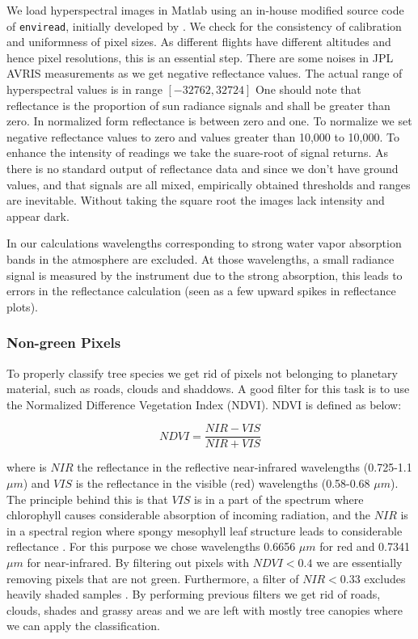 \documentclass[remotesensing,article,accept,moreauthors,pdftex,12pt,a4paper]{mdpi}
\begin{document}
We load hyperspectral images in Matlab using an in-house modified source code of \texttt{enviread}, initially developed by \cite{howat2007enviread}. We check for the consistency of calibration and uniformness of pixel sizes. As different flights have different altitudes and hence pixel resolutions, this is an essential step. There are some noises in JPL AVRIS measurements as we get negative reflectance values. The actual range of hyperspectral values is in range $[-32762, 32724]$ One should note that reflectance is the proportion of sun radiance signals and shall be greater than zero. In normalized form reflectance is between zero and one. To normalize we set negative reflectance values to zero and values greater than 10,000 to 10,000. To enhance the intensity of readings we take the suare-root of signal returns. As there is no standard output of reflectance data and since we don't have ground values, and that signals are all mixed, empirically obtained thresholds and ranges are inevitable. Without taking the square root the images lack intensity and appear dark.

In our calculations wavelengths corresponding to strong water vapor absorption bands in the atmosphere are excluded. At those wavelengths, a small radiance signal is measured by the instrument due to the strong absorption, this leads to errors in the reflectance calculation (seen as a few upward spikes in reflectance plots). 


\subsubsection{Non-green Pixels}

To properly classify tree species we get rid of pixels not belonging to planetary material, such as roads, clouds and shaddows. A good filter for this task is to use the Normalized Difference Vegetation Index (NDVI). NDVI is defined as below:

\begin{equation}\label{xx}
NDVI  = \frac{NIR - VIS}{NIR + VIS}
\end{equation}

where is $NIR$ the reflectance in the reflective near-infrared wavelengths (0.725-1.1 $\mu m$) and $VIS$ is the reflectance in the visible (red) wavelengths (0.58-0.68 $\mu m$). The principle behind this is that $VIS$ is in a part of the spectrum where chlorophyll causes considerable absorption of incoming radiation, and the $NIR$ is in a spectral region where spongy mesophyll leaf structure leads to considerable reflectance \cite{tucker1979red, jackson1983discrimination}. For this purpose we chose wavelengths 0.6656 $\mu m$ for red and 0.7341 $\mu m$ for near-infrared. By filtering out pixels with $NDVI < 0.4$ we are essentially removing pixels that are not green. Furthermore, a filter of $NIR < 0.33$  excludes heavily shaded samples \cite{colgan2012mapping}. By performing previous filters we get rid of roads, clouds, shades and grassy areas and we are left with mostly tree canopies where we can apply the classification.
\end{document}
